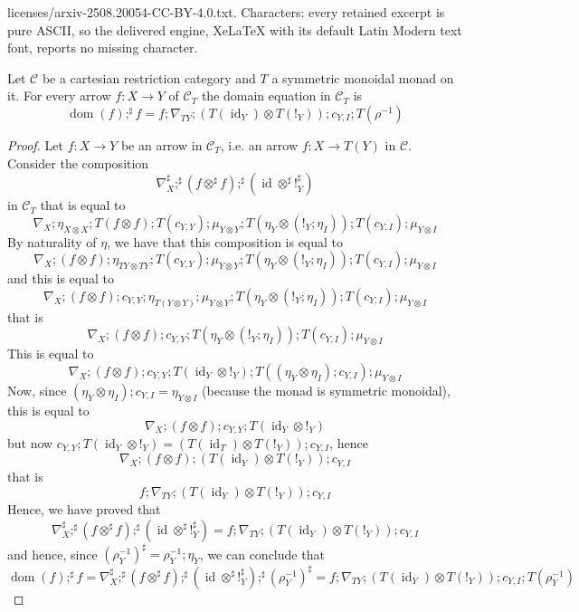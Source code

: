 \documentclass[10pt,a4paper]{amsart}
\def\dom{\operatorname{ dom}}      %
\def\id{\operatorname{ id}}         %
\def\mC{\mathcal{C}}
\newcommand{\freccia}[3]{#2 \colon #1  \to #3}
\begin{document}
licenses/arxiv-2508.20054-CC-BY-4.0.txt. Characters: every retained excerpt is pure ASCII, so the delivered engine, XeLaTeX with its default Latin Modern text font, reports no missing character.
\begin{lemma}\label{lemma dom f;f nelle kleisli}
Let $\mC$ be a cartesian restriction category and $T$ a symmetric monoidal monad on it. For every arrow $\freccia{X}{f}{Y}$ of $\mC_T$ the domain %
equation in $\mC_T$ is%
\[
\dom(f);^{\sharp}f=
f;\nabla_{TY};(T(\id_Y)\otimes T(!_Y));c_{Y,I};T(\rho^{-1})
\]
\end{lemma}

\begin{proof}
		Let $f:X\to Y$ be an arrow in $\mC_T$, i.e. an arrow $f:X\to T(Y)$ in $\mC$. Consider the composition
		\[\nabla_X^{\sharp};^{\sharp} (f\otimes^{\sharp}  f);^{\sharp}(\id\otimes^{\sharp}!^{\sharp}_Y)\]
		in $\mC_T$ that is equal to 
		\[\nabla_X; \eta_{X\otimes X}; T(f\otimes f);T( c_{Y,Y});\mu_{Y\otimes Y}; T(\eta_Y\otimes (!_Y;\eta_I));T( c_{Y,I});\mu_{Y\otimes I}\]
		By naturality of  $\eta$, we have that this composition is equal to
				\[ \nabla_X; (f\otimes f);\eta_{TY\otimes TY};
		T( c_{Y,Y});\mu_{Y\otimes Y}; T(\eta_Y\otimes (!_Y;\eta_I));T( c_{Y,I});\mu_{Y\otimes I}
		\]
		and this is equal to 
				\[\nabla_X;	(f\otimes f); c_{Y,Y};\eta_{T(Y\otimes Y)};
		\mu_{Y\otimes Y};T(\eta_Y\otimes (!_Y;\eta_I));T( c_{Y,I});	\mu_{Y\otimes I}
		\]
		that is 
			\[\nabla_X;	(f\otimes f); c_{Y,Y};T(\eta_Y\otimes (!_Y;\eta_I));T( c_{Y,I});\mu_{Y\otimes I}
		\]
		This is equal to
				\[\nabla_X;	(f\otimes f); c_{Y,Y};T(\id_Y \otimes !_Y);
		T( (\eta_Y\otimes \eta_I);c_{Y,I});\mu_{Y\otimes I}
		\]
		Now, since $ (\eta_Y\otimes \eta_I); c_{Y,I}= \eta_{Y\otimes I}$ (because the monad is symmetric monoidal), this is equal to
				\[\nabla_X;	(f\otimes f); c_{Y,Y};T(\id_Y \otimes !_Y)
		\]
		but now $c_{Y,Y};T(\id_Y \otimes !_Y)=(T(\id_T)\otimes T(!_Y));c_{Y,I}$, hence
				\[\nabla_X;(f\otimes f);	(T(\id_Y)\otimes T(!_Y));
		c_{Y,I}
		\]
		that is
		\[f;\nabla_{TY};(T(\id_Y)\otimes T(!_Y));c_{Y,I}	\]		
		Hence, we have proved that 
			\[\nabla_X^{\sharp};^{\sharp} (f\otimes^{\sharp}  f);^{\sharp}(\id\otimes^{\sharp}!^{\sharp}_Y)=f;\nabla_{TY};(T(\id_Y)\otimes T(!_Y));c_{Y,I}\]
%
and hence, since $(\rho^{-1}_Y)^{\sharp}=\rho^{-1}_Y;\eta_{Y}$, we can conclude that
\[\dom(f);^{\sharp}f=\nabla_X^{\sharp};^{\sharp} (f\otimes^{\sharp}  f);^{\sharp}(\id\otimes^{\sharp}!^{\sharp}_Y);^{\sharp}(\rho_Y^{-1})^{\sharp}=f;\nabla_{TY};(T(\id_Y)\otimes T(!_Y));c_{Y,I};T(\rho_Y^{-1})\]
\end{proof}
\end{document}
